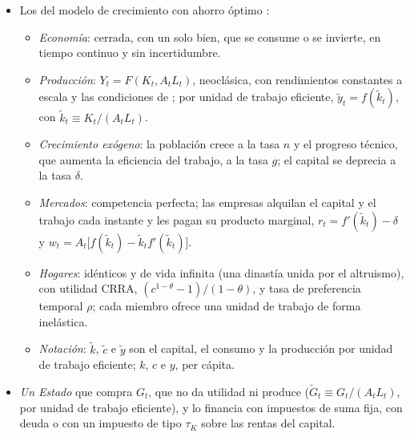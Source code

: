 \documentclass[11pt]{article}
\begin{document}
\begin{itemize}
\item Los del modelo de crecimiento con ahorro óptimo :
  \begin{itemize}
  \item \emph{Economía}: cerrada, con un solo bien, que se consume o se invierte, en tiempo continuo y sin incertidumbre.
  \item \emph{Producción}: $Y_t=F(K_t,A_tL_t)$, neoclásica, con rendimientos constantes a escala y las condiciones de ; por unidad de trabajo eficiente, $\tilde y_t=f(\tilde k_t)$, con $\tilde k_t\equiv K_t/(A_tL_t)$.
  \item \emph{Crecimiento exógeno}: la población crece a la tasa $n$ y el progreso técnico, que aumenta la eficiencia del trabajo, a la tasa $g$; el capital se deprecia a la tasa $\delta$.
  \item \emph{Mercados}: competencia perfecta; las empresas alquilan el capital y el trabajo cada instante y les pagan su producto marginal, $r_t=f'(\tilde k_t)-\delta$ y $w_t=A_t\big[f(\tilde k_t)-\tilde k_tf'(\tilde k_t)\big]$.
  \item \emph{Hogares}: idénticos y de vida infinita (una dinastía unida por el altruismo), con utilidad CRRA, $(c^{1-\theta}-1)/(1-\theta)$, y tasa de preferencia temporal $\rho$; cada miembro ofrece una unidad de trabajo de forma inelástica.
  \item \emph{Notación}: $\tilde k$, $\tilde c$ e $\tilde y$ son el capital, el consumo y la producción por unidad de trabajo eficiente; $k$, $c$ e $y$, per cápita.
  \end{itemize}
\item \emph{Un Estado} que compra $G_t$, que no da utilidad ni produce ($\tilde G_t\equiv G_t/(A_tL_t)$, por unidad de trabajo eficiente), y lo financia con impuestos de suma fija, con deuda o con un impuesto de tipo $\tau_K$ sobre las rentas del capital.
\end{itemize}
\end{document}

